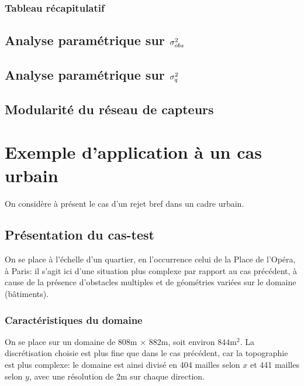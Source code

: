 
\subsubsection{Tableau récapitulatif}


\subsection{Analyse paramétrique sur ${\sigma_{obs}^2}$}

\subsection{Analyse paramétrique sur $\sigma_q^2$}

\subsection{Modularité du réseau de capteurs}

\section{Exemple d'application à un cas urbain}

On considère à présent le cas d'un rejet bref dans un cadre urbain.\\

\subsection{Présentation du cas-test}

On se place à l'échelle d'un quartier, en l'occurrence celui de la Place de l'Opéra, à Paris: il s'agit ici d'une situation plus complexe par rapport au cas précédent, à cause de la présence d'obstacles multiples et de géométries variées sur le domaine (bâtiments). \\


\subsubsection{Caractéristiques du domaine}

On se place sur un domaine de 808m $\times$ 882m, soit environ $844\text{m}^2$. La discrétisation choisie est plus fine que dans le cas précédent, car la topographie est plus complexe: le domaine est ainsi divisé en 404 mailles selon $x$ et 441 mailles selon $y$, avec une résolution de 2m sur chaque direction. \\

